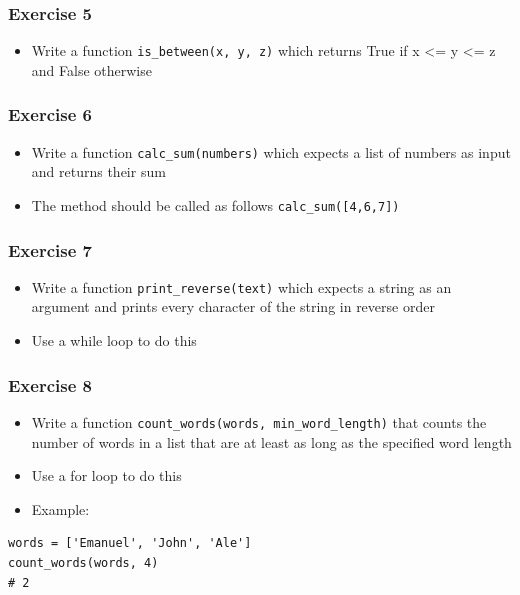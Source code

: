 \documentclass[10pt, a4paper]{beamer} %
\begin{document}
{\begin{frame}[c, fragile]
\end{frame}

\begin{frame}[c, fragile]\frametitle{Exercise 5}
\begin{itemize}
    \item Write a function \texttt{is\_between(x, y, z)} which returns True if x <= y <=
z and False otherwise
\end{itemize}
    
\end{frame}

\begin{frame}[c, fragile]\frametitle{Exercise 6}
    
\begin{itemize}
    \item Write a function \texttt{calc\_sum(numbers)} which expects a list of numbers as input and returns their sum
    \item The method should be called as follows \texttt{calc\_sum([4,6,7])}
\end{itemize}
\end{frame}

\begin{frame}[c, fragile]\frametitle{Exercise 7}
    
\begin{itemize}
    \item Write a function \texttt{print\_reverse(text)} which expects a string as an argument and prints every character of the string in reverse order
    \item Use a while loop to do this
\end{itemize}
\end{frame}

\begin{frame}[c, fragile]\frametitle{Exercise 8}
\begin{itemize}
\item Write a function \texttt{count\_words(words, min\_word\_length)} that counts the number of words in a list that are at least as long as the specified word length
\item Use a for loop to do this
\item Example:
\end{itemize}

{
\mdseries
{}
\begin{lstlisting}
words = ['Emanuel', 'John', 'Ale']
count_words(words, 4)
# 2
\end{lstlisting}
}


\end{frame}}
\end{document}
